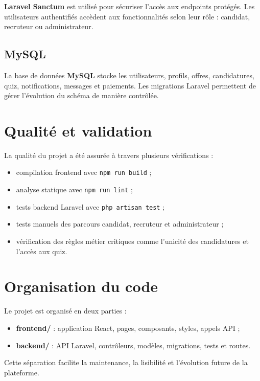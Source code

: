 \noindent
\textbf{Laravel Sanctum} est utilisé pour sécuriser l'accès aux endpoints protégés. Les utilisateurs authentifiés accèdent aux fonctionnalités selon leur rôle : candidat, recruteur ou administrateur.

\subsection{MySQL}

\noindent
La base de données \textbf{MySQL} stocke les utilisateurs, profils, offres, candidatures, quiz, notifications, messages et paiements. Les migrations Laravel permettent de gérer l'évolution du schéma de manière contrôlée.

\section{Qualité et validation}

\noindent
La qualité du projet a été assurée à travers plusieurs vérifications :

\begin{itemize}
    \item compilation frontend avec \texttt{npm run build} ;
    \item analyse statique avec \texttt{npm run lint} ;
    \item tests backend Laravel avec \texttt{php artisan test} ;
    \item tests manuels des parcours candidat, recruteur et administrateur ;
    \item vérification des règles métier critiques comme l'unicité des candidatures et l'accès aux quiz.
\end{itemize}

\section{Organisation du code}

\noindent
Le projet est organisé en deux parties :

\begin{itemize}
    \item \textbf{frontend/} : application React, pages, composants, styles, appels API ;
    \item \textbf{backend/} : API Laravel, contrôleurs, modèles, migrations, tests et routes.
\end{itemize}

\noindent
Cette séparation facilite la maintenance, la lisibilité et l'évolution future de la plateforme.
